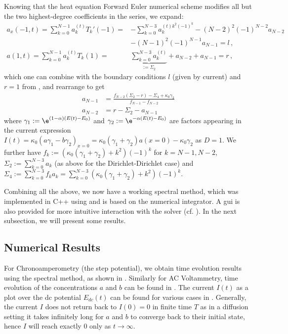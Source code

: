 \documentclass{prettytex/ox/mmsc-special-topic}
\begin{document}
  Knowing that the heat equation Forward Euler numerical scheme modifies all but the two highest-degree coefficients in the series, we expand:
  \begin{align*}
    a_x(-1, t) = \sum_{k=0}^{N-1} a_k^{(t)} T_k'(-1) =   & -\sum_{k=0}^{N-3} a_k^{(t) k^2 (-1)^{k}} - (N-2)^2 (-1)^{N-2} a_{N-2}                                            \\
                                                         & -(N-1)^2 (-1)^{N-1} a_{N-1} = l\,,                                                                               \\
    a(1, t)    = \sum_{k=0}^{N-1} a_k^{(t)} T_k(1)     = & \underbrace{\sum_{k=0}^{N-3} a_k^{(t)}}_{:= \Sigma_2}              + a_{N-2}                    + a_{N-1} = r\,,
  \end{align*}
  which one can combine with the boundary conditions $l$ (given by current) and $r = 1$ from , and rearrange to get
  \begin{align}
    a_{N-1} & = \frac{f_{N-2}(\Sigma_2 - r) - \Sigma_4 + \kappa_0 \gamma_2}{f_{N-1} - f_{N-2}} \\
    a_{N-2} & = r - \Sigma_2 - a_{N-1}
  \end{align}
  where $\gamma_1 := \e^{(1-\alpha)(E(t) - E_0)}$ and $\gamma_2 := \e^{-\alpha(E(t) - E_0)}$ are factors appearing in the current expression $I(t) = \kappa_0 \left(a \gamma_1 - b \gamma_2\right)_{x=0} = \kappa_0 (\gamma_1 + \gamma_2) a(x=0) - \kappa_0 \gamma_2$ as $D=1$.
  We further have $f_k := \left(\kappa_0 (\gamma_1 + \gamma_2) + k^2\right)(-1)^k$ for $k = N-1, N-2$, $\Sigma_2 := \sum_{k=0}^{N-3} a_k$ (as above for the Dirichlet-Dirichlet case) and $\Sigma_4 := \sum_{k=0}^{N-3} f_k a_k = \sum_{k=0}^{N-3} \left(\kappa_0 (\gamma_1 + \gamma_2) + k^2\right)(-1)^k$.

  Combining all the above, we now have a working spectral method, which was implemented in C++ using \tschebfun and is based on the \heatfun numerical integrator.
  A \gls{gui} is also provided for more intuitive interaction with the solver (cf. ).
  In the next subsection, we will present some results.

  \subsection{Numerical Results}
  For Chronoamperometry (the step potential), we obtain time evolution results using the spectral method, as shown in .
  Similarly for AC Voltammetry, time evolution of the concentrations $a$ and $b$ can be found in .
  The current $I(t)$ as a plot over the \gls{dc} potential $E_{dc}(t)$ can be found for various cases in .
  Generally, the current $I$ does not return back to $I(0) = 0$ in finite time $T$ as in a diffusion setting it takes infinitely long for $a$ and $b$ to converge back to their initial state, hence $I$ will reach exactly $0$ only as $t \rightarrow \infty$.
\end{document}
